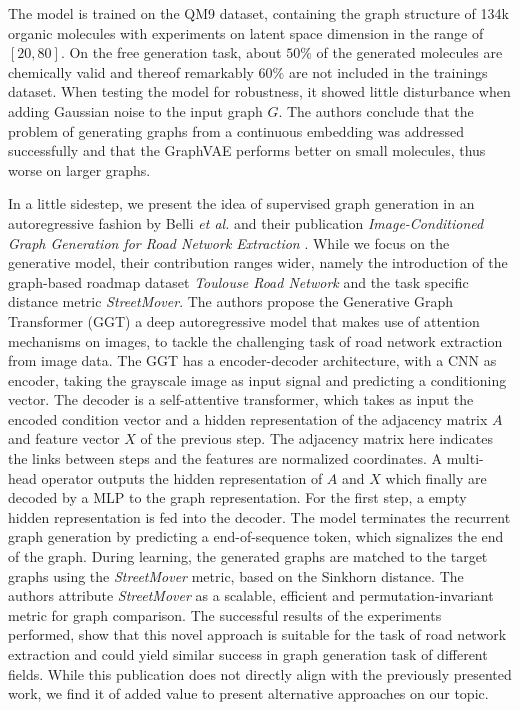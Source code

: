 The model is trained on the QM9 dataset, containing the graph structure of 134k organic molecules with experiments on latent space dimension in the range of $[20,80]$. On the free generation task, about $50\%$ of the generated molecules are chemically valid and thereof remarkably $60\%$ are not included in the trainings dataset. When testing the model for robustness, it showed little disturbance when adding Gaussian noise to the input graph $G$. The authors conclude that the problem of generating graphs
from a continuous embedding was addressed successfully and that the GraphVAE performs better on small molecules, thus worse on larger graphs.


In a little sidestep, we present the idea of supervised graph generation in an autoregressive fashion by Belli \textit{et al.} and their publication \textit{Image-Conditioned Graph Generation for Road Network Extraction} \cite{belli_image-conditioned_2019}. While we focus on the generative model, their contribution ranges wider, namely the introduction of the graph-based roadmap dataset \textit{Toulouse Road Network} and the task specific distance metric \textit{StreetMover}. The authors propose the Generative Graph Transformer (GGT) a deep autoregressive model that makes use of attention mechanisms on images, to tackle the challenging task of road network extraction from image data. The GGT has a encoder-decoder architecture, with a CNN as encoder, taking the grayscale image as input signal and predicting a conditioning vector. The decoder is a self-attentive transformer, which takes as input the encoded condition vector and a hidden representation of the adjacency matrix $A$ and feature vector $X$ of the previous step. The adjacency matrix here indicates the links between steps and the features are normalized coordinates. A multi-head operator outputs the hidden representation of $A$ and $X$ which finally are decoded by a MLP to the graph representation. For the first step, a empty hidden representation is fed into the decoder. The model terminates the recurrent graph generation by predicting a end-of-sequence token, which signalizes the end of the graph. During learning, the generated graphs are matched to the target graphs using the \textit{StreetMover} metric, based on the Sinkhorn distance. The authors attribute \textit{StreetMover} as a scalable, efficient and permutation-invariant metric for graph comparison. The successful results of the experiments performed, show that this novel approach is suitable for the task of road network extraction and could yield similar success in graph generation task of different fields.
While this publication does not directly align with the previously presented work, we find it of added value to present alternative approaches on our topic.

